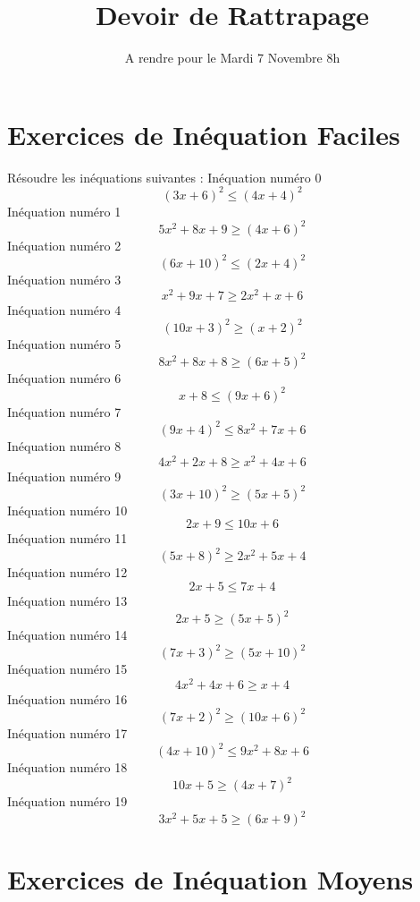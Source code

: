 \documentclass{article}
\title{Devoir de Rattrapage}
\date{A rendre pour le Mardi 7 Novembre 8h}\usepackage{natbib}
\begin{document}
\maketitle
 \section{Exercices de In\'equation Faciles}

 R\'esoudre les in\'equations suivantes : 
In\'equation num\'ero 0 \[\left(3 x + 6\right)^{2} \leq \left(4 x + 4\right)^{2}\]In\'equation num\'ero 1 \[5 x^{2} + 8 x + 9 \geq \left(4 x + 6\right)^{2}\]In\'equation num\'ero 2 \[\left(6 x + 10\right)^{2} \leq \left(2 x + 4\right)^{2}\]In\'equation num\'ero 3 \[x^{2} + 9 x + 7 \geq 2 x^{2} + x + 6\]In\'equation num\'ero 4 \[\left(10 x + 3\right)^{2} \geq \left(x + 2\right)^{2}\]In\'equation num\'ero 5 \[8 x^{2} + 8 x + 8 \geq \left(6 x + 5\right)^{2}\]In\'equation num\'ero 6 \[x + 8 \leq \left(9 x + 6\right)^{2}\]In\'equation num\'ero 7 \[\left(9 x + 4\right)^{2} \leq 8 x^{2} + 7 x + 6\]In\'equation num\'ero 8 \[4 x^{2} + 2 x + 8 \geq x^{2} + 4 x + 6\]In\'equation num\'ero 9 \[\left(3 x + 10\right)^{2} \geq \left(5 x + 5\right)^{2}\]In\'equation num\'ero 10 \[2 x + 9 \leq 10 x + 6\]In\'equation num\'ero 11 \[\left(5 x + 8\right)^{2} \geq 2 x^{2} + 5 x + 4\]In\'equation num\'ero 12 \[2 x + 5 \leq 7 x + 4\]In\'equation num\'ero 13 \[2 x + 5 \geq \left(5 x + 5\right)^{2}\]In\'equation num\'ero 14 \[\left(7 x + 3\right)^{2} \geq \left(5 x + 10\right)^{2}\]In\'equation num\'ero 15 \[4 x^{2} + 4 x + 6 \geq x + 4\]In\'equation num\'ero 16 \[\left(7 x + 2\right)^{2} \geq \left(10 x + 6\right)^{2}\]In\'equation num\'ero 17 \[\left(4 x + 10\right)^{2} \leq 9 x^{2} + 8 x + 6\]In\'equation num\'ero 18 \[10 x + 5 \geq \left(4 x + 7\right)^{2}\]In\'equation num\'ero 19 \[3 x^{2} + 5 x + 5 \geq \left(6 x + 9\right)^{2}\]
 \section{Exercices de In\'equation Moyens}
\end{document}
